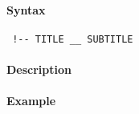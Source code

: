 


	\paragraph{Syntax}
 
 \begin{verbatim}
 !-- TITLE __ SUBTITLE
 \end{verbatim}
 
 \paragraph{Description}
 
 \paragraph{Example}


